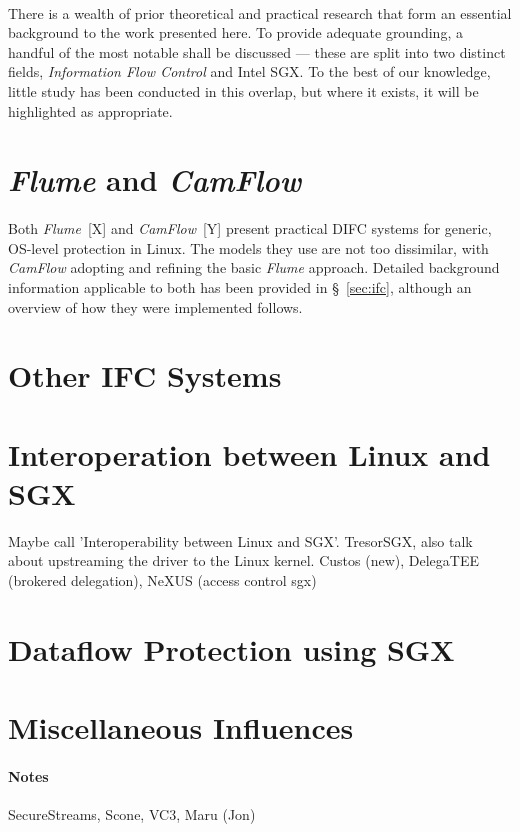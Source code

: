 \paragraph{} There is a wealth of prior theoretical and practical research that form an essential background to the work presented here. To provide adequate grounding, a handful of the most notable shall be discussed --- these are split into two distinct fields, \textit{Information Flow Control} and Intel SGX. To the best of our knowledge, little study has been conducted in this overlap, but where it exists, it will be highlighted as appropriate.


\section{\textit{Flume} and \textit{CamFlow}}
\paragraph{} Both \textit{Flume}~[X] and \textit{CamFlow}~[Y] present practical DIFC systems for generic, OS-level protection in Linux. The models they use are not too dissimilar, with \textit{CamFlow} adopting and refining the basic \textit{Flume} approach. Detailed background information applicable to both has been provided in §~\ref{sec:ifc}, although an overview of how they were implemented follows.

\section{Other IFC Systems}

\section{Interoperation between Linux and SGX} Maybe call 'Interoperability between Linux and SGX'. TresorSGX, also talk about upstreaming the driver to the Linux kernel. Custos (new), DelegaTEE (brokered delegation), NeXUS (access control sgx)


\section{Dataflow Protection using SGX}

\section{Miscellaneous Influences}


\paragraph{Notes} SecureStreams, Scone, VC3, Maru (Jon)

